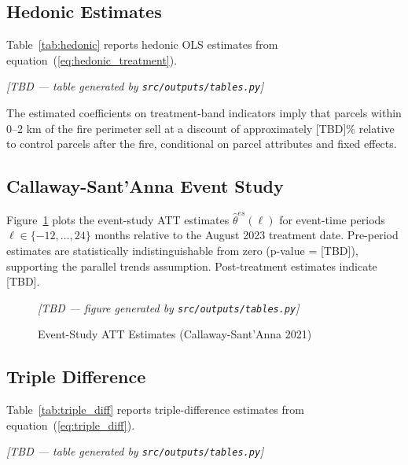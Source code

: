 \documentclass[12pt]{article}
\begin{document}
\subsection{Hedonic Estimates}

Table~\ref{tab:hedonic} reports hedonic OLS estimates from
equation~(\ref{eq:hedonic_treatment}).

\begin{table}[H]
\caption{Hedonic Price Regression}
\label{tab:hedonic}
\centering
% 
\textit{[TBD --- table generated by \texttt{src/outputs/tables.py}]}
\end{table}

The estimated coefficients on treatment-band indicators imply that parcels
within 0--2 km of the fire perimeter sell at a discount of approximately
[TBD]\% relative to control parcels after the fire, conditional on parcel
attributes and fixed effects.

\subsection{Callaway-Sant'Anna Event Study}

Figure~\ref{fig:event_study} plots the event-study ATT estimates
$\hat\theta^{es}(\ell)$ for event-time periods $\ell \in \{-12, \ldots, 24\}$
months relative to the August 2023 treatment date. Pre-period estimates are
statistically indistinguishable from zero (p-value = [TBD]), supporting the
parallel trends assumption. Post-treatment estimates indicate [TBD].

\begin{figure}[H]
\centering
\textit{[TBD --- figure generated by \texttt{src/outputs/tables.py}]}
\caption{Event-Study ATT Estimates (Callaway-Sant'Anna 2021)}
\label{fig:event_study}
\end{figure}

\subsection{Triple Difference}

Table~\ref{tab:triple_diff} reports triple-difference estimates from
equation~(\ref{eq:triple_diff}).

\begin{table}[H]
\caption{Triple-Difference Decomposition}
\label{tab:triple_diff}
\centering
% 
\textit{[TBD --- table generated by \texttt{src/outputs/tables.py}]}
\end{table}
\end{document}
